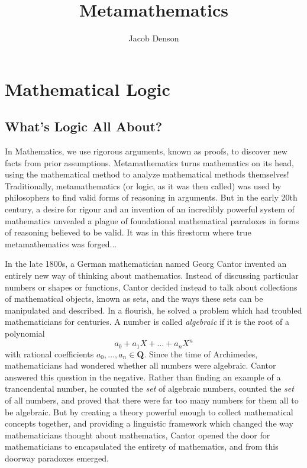 

\title{Metamathematics}
\author{Jacob Denson}



\maketitle
\tableofcontents

\part{Mathematical Logic}

\chapter{What's Logic All About?}


In Mathematics, we use rigorous arguments, known as proofs, to discover new facts from prior assumptions. Metamathematics turns mathematics on its head, using the mathematical method to analyze mathematical methods themselves! Traditionally, metamathematics (or logic, as it was then called) was used by philosophers to find valid forms of reasoning in arguments. But in the early 20th century, a desire for rigour and an invention of an incredibly powerful system of mathematics unvealed a plague of foundational mathematical paradoxes in forms of reasoning believed to be valid. It was in this firestorm where true metamathematics was forged...

In the late 1800s, a German mathematician named Georg Cantor invented an entirely new way of thinking about mathematics. Instead of discussing particular numbers or shapes or functions, Cantor decided instead to talk about collections of mathematical objects, known as sets, and the ways these sets can be manipulated and described. In a flourish, he solved a problem which had troubled mathematicians for centuries. A number is called {\it algebraic} if it is the root of a polynomial
%
\[ a_0 + a_1 X + \dots + a_n X^n \]
%
with rational coefficients $a_0, \dots, a_n \in \mathbf{Q}$.  Since the time of Archimedes, mathematicians had wondered whether all numbers were algebraic. Cantor answered this question in the negative. Rather than finding an example of a trancendental number, he counted the {\it set} of algebraic numbers, counted the {\it set} of all numbers, and proved that there were far too many numbers for them all to be algebraic. But by creating a theory powerful enough to collect mathematical concepts together, and providing a linguistic framework which changed the way mathematicians thought about mathematics, Cantor opened the door for mathematicians to encapsulated the entirety of mathematics, and from this doorway paradoxes emerged.

